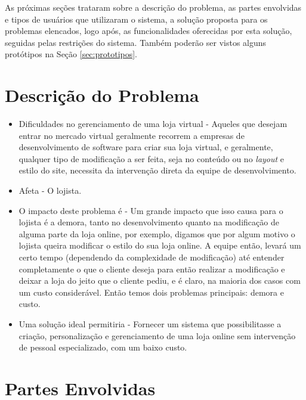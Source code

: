 \documentclass[a4paper,12pt]{monografia}
\begin{document}
As próximas seções trataram sobre a descrição do problema, as partes envolvidas e tipos de usuários que utilizaram o sistema, a solução proposta para os problemas elencados, logo após, as funcionalidades oferecidas por esta solução, seguidas pelas restrições do sistema. Também poderão ser vistos alguns protótipos na Seção \ref{sec:prototipos}.


\section{Descrição do Problema} %
\label{cha:descricao_do_problema}

\begin{itemize}
\item Dificuldades no gerenciamento de uma loja virtual - 
Aqueles que desejam entrar no mercado virtual geralmente recorrem a empresas de desenvolvimento de software para criar sua loja virtual, e geralmente, qualquer tipo de modificação a ser feita, seja no conteúdo ou no \textit{layout} e estilo do site, necessita da intervenção direta da equipe de desenvolvimento.

\item Afeta - O lojista.
\item O impacto deste problema é - 
Um grande impacto que isso causa para o lojista é a demora, tanto no desenvolvimento quanto na modificação de alguma parte da loja online, por exemplo, digamos que por algum motivo o lojista queira modificar o estilo do sua loja online. A equipe então, levará um certo tempo (dependendo da complexidade de modificação) até entender completamente o que o cliente deseja para então realizar a modificação e deixar a loja do jeito que o cliente pediu, e é claro, na maioria dos casos com um custo considerável. Então temos dois problemas principais: demora e custo.

\item Uma solução ideal permitiria - 
Fornecer um sistema que possibilitasse a criação, personalização  e gerenciamento de uma loja online sem intervenção de pessoal especializado, com um baixo custo.

\end{itemize}


\section{Partes Envolvidas} %
\label{sec:partes_envolvidas}
\end{document}
